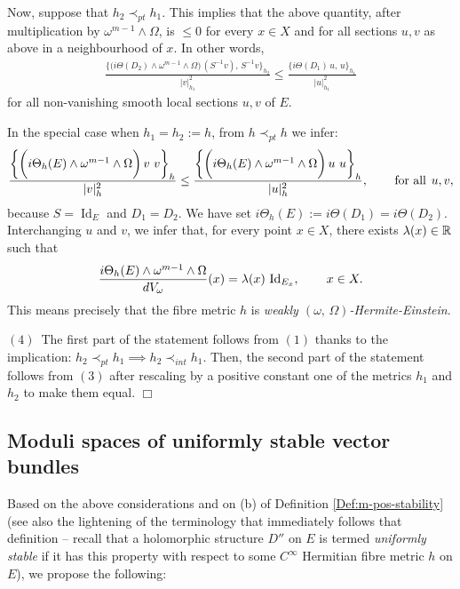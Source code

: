 \documentclass[12pt]{article}
\begin{document}
Now, suppose that $h_2\prec_{pt} h_1$. This implies that the above quantity, after multiplication by $\omega^{m-1}\wedge\Omega$, is $\leq 0$ for every $x\in X$ and for all sections $u,v$ as above in a neighbourhood of $x$. In other words, \begin{eqnarray*}\frac{\bigg\{\bigg(i\Theta(D_2)\wedge\omega^{m-1}\wedge\Omega\bigg)\,(S^{-1}v),\,S^{-1}v\bigg\}_{h_2}}{|v|^2_{h_1}} \leq \frac{\bigg\{i\Theta(D_1)\,u,\,u\bigg\}_{h_1}}{|u|^2_{h_1}}\end{eqnarray*} for all non-vanishing smooth local sections $u,v$ of $E$.

In the special case when $h_1 = h_2:=h$, from $h\prec_{pt} h$ we infer: \begin{eqnarray*}\frac{\bigg\{\bigg(i\Theta_h(E)\wedge\omega^{m-1}\wedge\Omega\bigg)\,v\,\,v\bigg\}_h}{|v|^2_h}\leq\frac{\bigg\{\bigg(i\Theta_h(E)\wedge\omega^{m-1}\wedge\Omega\bigg)\,u\,\,u\bigg\}_h}{|u|^2_h}, \hspace{5ex} \mbox{for all}\hspace{1ex} u,v,\end{eqnarray*} because $S=\operatorname{Id}_E$ and $D_1=D_2$. We have set $i\Theta_h(E):= i\Theta(D_1) = i\Theta(D_2)$. Interchanging $u$ and $v$, we infer that, for every point $x\in X$, there exists $\lambda(x)\in\mathbb{R}$ such that \begin{eqnarray*}\frac{i\Theta_h(E)\wedge\omega^{m-1}\wedge\Omega}{dV_\omega}(x) = \lambda(x)\,\operatorname{Id}_{E_x},  \hspace{5ex} x\in X.\end{eqnarray*} This means precisely that the fibre metric $h$ is {\it weakly $(\omega,\,\Omega)$-Hermite-Einstein}.

\vspace{1ex}

$(4)$\, The first part of the statement follows from $(1)$ thanks to the implication: $h_2\prec_{pt}h_1 \implies h_2\prec_{int}h_1$. Then, the second part of the statement follows from $(3)$ after rescaling by a positive constant one of the metrics $h_1$ and $h_2$ to make them equal.  \hfill $\Box$


\subsection{Moduli spaces of uniformly stable vector bundles}\label{subsection:moduli_unif-stable}

Based on the above considerations and on (b) of Definition \ref{Def:m-pos-stability} (see also the lightening of the terminology that immediately follows that definition -- recall that a holomorphic structure $D''$ on $E$ is termed {\it uniformly stable} if it has this property with respect to some  $C^\infty$ Hermitian fibre metric $h$ on $E$), we propose the following:
\end{document}
